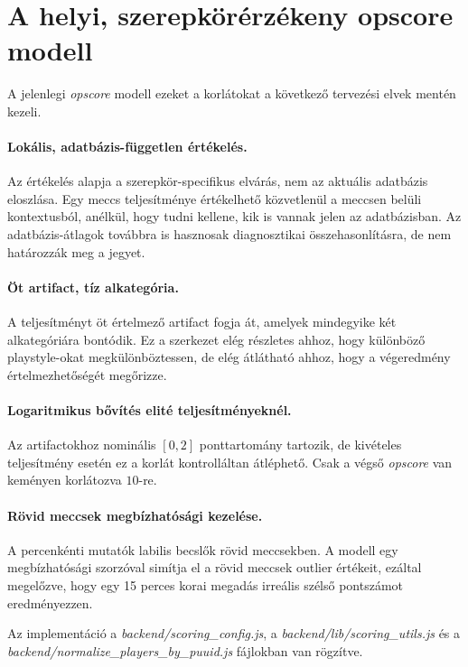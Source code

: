 \section{A helyi, szerepkörérzékeny opscore modell}

A jelenlegi \textit{opscore} modell ezeket a korlátokat a következő tervezési elvek mentén kezeli.

\paragraph{Lokális, adatbázis-független értékelés.}
Az értékelés alapja a szerepkör-specifikus elvárás, nem az aktuális adatbázis eloszlása. Egy meccs teljesítménye értékelhető közvetlenül a meccsen belüli kontextusból, anélkül, hogy tudni kellene, kik is vannak jelen az adatbázisban. Az adatbázis-átlagok továbbra is hasznosak diagnosztikai összehasonlításra, de nem határozzák meg a jegyet.

\paragraph{Öt artifact, tíz alkategória.}
A teljesítményt öt értelmező artifact fogja át, amelyek mindegyike két alkategóriára bontódik. Ez a szerkezet elég részletes ahhoz, hogy különböző playstyle-okat megkülönböztessen, de elég átlátható ahhoz, hogy a végeredmény értelmezhetőségét megőrizze.

\paragraph{Logaritmikus bővítés elité teljesítményeknél.}
Az artifactokhoz nominális $[0, 2]$ ponttartomány tartozik, de kivételes teljesítmény esetén ez a korlát kontrolláltan átléphető. Csak a végső \textit{opscore} van keményen korlátozva $10$-re.

\paragraph{Rövid meccsek megbízhatósági kezelése.}
A percenkénti mutatók labilis becslők rövid meccsekben. A modell egy megbízhatósági szorzóval simítja el a rövid meccsek outlier értékeit, ezáltal megelőzve, hogy egy 15 perces korai megadás irreális szélső pontszámot eredményezzen.

Az implementáció a \textit{backend/scoring\_config.js}, a \textit{backend/lib/scoring\_utils.js} és a \textit{backend/normalize\_players\_by\_puuid.js} fájlokban van rögzítve.

